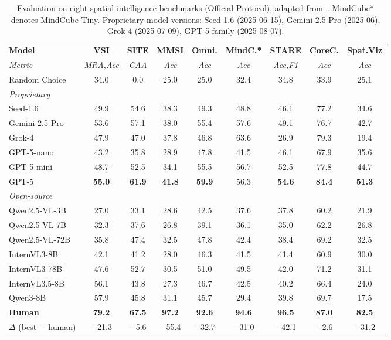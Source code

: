 \begin{table}[htbp]
\centering
\caption{Evaluation on eight spatial intelligence benchmarks (Official Protocol), adapted from~\cite{cai2025holisticevaluationmultimodalllms}. MindCube* denotes MindCube-Tiny. Proprietary model versions: Seed-1.6 (2025-06-15), Gemini-2.5-Pro (2025-06), Grok-4 (2025-07-09), GPT-5 family (2025-08-07).}
\label{tab:main_results}
\renewcommand{\arraystretch}{1.1}
\footnotesize
\setlength{\tabcolsep}{4pt}
\begin{tabular}{lcccccccc}
\toprule
\textbf{Model} & \textbf{VSI} & \textbf{SITE} & \textbf{MMSI} & \textbf{Omni.} & \textbf{MindC.*} & \textbf{STARE} & \textbf{CoreC.} & \textbf{Spat.Viz} \\
\textit{Metric} & \textit{MRA,Acc} & \textit{CAA} & \textit{Acc} & \textit{Acc} & \textit{Acc} & \textit{Acc,F1} & \textit{Acc} & \textit{Acc} \\
\midrule
Random Choice & 34.0 & 0.0 & 25.0 & 25.0 & 32.4 & 34.8 & 33.9 & 25.1 \\
\midrule
\multicolumn{9}{l}{\textit{Proprietary}} \\
Seed-1.6 & 49.9 & 54.6 & 38.3 & 49.3 & 48.8 & 46.1 & 77.2 & 34.6 \\
Gemini-2.5-Pro & 53.6 & 57.1 & 38.0 & 55.4 & 57.6 & 49.1 & 76.7 & 42.7 \\
Grok-4 & 47.9 & 47.0 & 37.8 & 46.8 & 63.6 & 26.9 & 79.3 & 19.4 \\
GPT-5-nano & 43.2 & 35.8 & 28.9 & 47.8 & 41.5 & 46.1 & 67.9 & 35.6 \\
GPT-5-mini & 48.7 & 52.5 & 34.1 & 55.5 & 56.7 & 52.5 & 77.8 & 44.7 \\
GPT-5 & \textbf{55.0} & \textbf{61.9} & \textbf{41.8} & \textbf{59.9} & 56.3 & \textbf{54.6} & \textbf{84.4} & \textbf{51.3} \\
\midrule
\multicolumn{9}{l}{\textit{Open-source}} \\
Qwen2.5-VL-3B & 27.0 & 33.1 & 28.6 & 42.5 & 37.6 & 37.8 & 60.2 & 21.9 \\
Qwen2.5-VL-7B & 32.3 & 37.6 & 26.8 & 39.1 & 36.1 & 35.0 & 62.2 & 26.8 \\
Qwen2.5-VL-72B & 35.8 & 47.4 & 32.5 & 47.8 & 42.4 & 38.4 & 69.2 & 32.5 \\
InternVL3-8B & 42.1 & 41.2 & 28.0 & 46.3 & 41.5 & 41.4 & 60.9 & 30.0 \\
InternVL3-78B & 47.6 & 52.7 & 30.5 & 51.0 & 49.5 & 42.0 & 71.2 & 31.1 \\
InternVL3.5-8B & 56.1 & 43.8 & 27.3 & 46.7 & 42.5 & 40.2 & 66.4 & 24.0 \\
Qwen3-8B & 57.9 & 45.8 & 31.1 & 45.7 & 29.4 & 39.8 & 69.7 & 17.5 \\
\midrule
\textbf{Human} & \textbf{79.2} & \textbf{67.5} & \textbf{97.2} & \textbf{92.6} & \textbf{94.6} & \textbf{96.5} & \textbf{87.0} & \textbf{82.5} \\
$\Delta$ (best $-$ human) & $-$21.3 & $-$5.6 & $-$55.4 & $-$32.7 & $-$31.0 & $-$42.1 & $-$2.6 & $-$31.2 \\
\bottomrule
\end{tabular}
\end{table}

